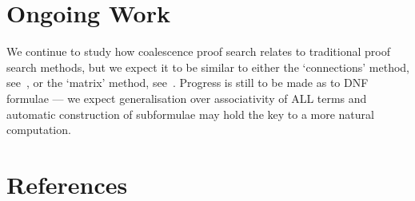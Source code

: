 \documentclass{article}
\theoremstyle{indented}
\begin{document}
    \section*{Ongoing Work}
        We continue to study how coalescence proof search relates to traditional proof search methods, but we expect it to be similar to either the `connections' method, see~\cite{connection-based-proof-method}, or the `matrix' method, see~\cite{tableaux-for-logic-of-proofs}.
        Progress is still to be made as to DNF formulae --- we expect generalisation over associativity of ALL terms and automatic construction of subformulae may hold the key to a more natural computation.

    \section*{References}
        
\end{document}
